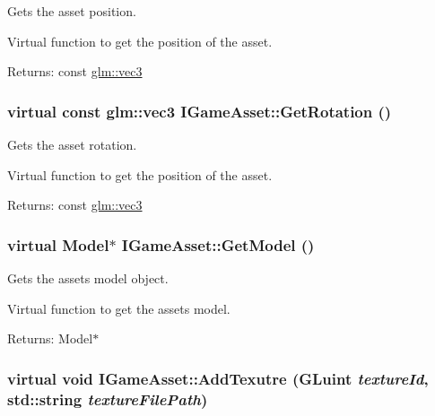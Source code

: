 Gets the asset position. 

Virtual function to get the position of the asset.

\begin{Desc}
\item[Returns:]const \hyperlink{group__core__types_g1c47e8b3386109bc992b6c48e91b0be7}{glm::vec3} \end{Desc}
\hypertarget{class_i_game_asset_b17b3face9a76d70d3b6537b19f7ba5b}{
\subsubsection[GetRotation]{\setlength{\rightskip}{0pt plus 5cm}virtual const {\bf glm::vec3} IGameAsset::GetRotation ()}}
\label{class_i_game_asset_b17b3face9a76d70d3b6537b19f7ba5b}


Gets the asset rotation. 

Virtual function to get the position of the asset.

\begin{Desc}
\item[Returns:]const \hyperlink{group__core__types_g1c47e8b3386109bc992b6c48e91b0be7}{glm::vec3} \end{Desc}
\hypertarget{class_i_game_asset_eee1dc987bfe4df399b6d9878b01b094}{
\subsubsection[GetModel]{\setlength{\rightskip}{0pt plus 5cm}virtual {\bf Model}$\ast$ IGameAsset::GetModel ()}}
\label{class_i_game_asset_eee1dc987bfe4df399b6d9878b01b094}


Gets the assets model object. 

Virtual function to get the assets model.

\begin{Desc}
\item[Returns:]Model$\ast$ \end{Desc}
\hypertarget{class_i_game_asset_cb5ed97729be8b36021acca98073b420}{
\subsubsection[AddTexutre]{\setlength{\rightskip}{0pt plus 5cm}virtual void IGameAsset::AddTexutre (GLuint {\em textureId}, \/  std::string {\em textureFilePath})}}
\label{class_i_game_asset_cb5ed97729be8b36021acca98073b420}



